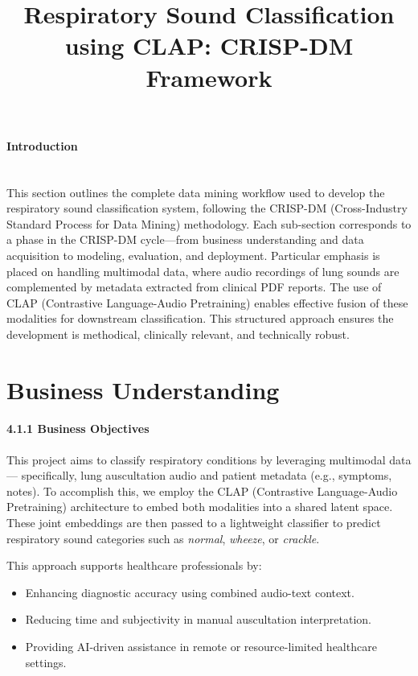 
\title{Respiratory Sound Classification using CLAP: CRISP-DM Framework}

\paragraph{Introduction\\\\}
This section outlines the complete data mining workflow used to develop the respiratory sound classification system, following the CRISP-DM (Cross-Industry Standard Process for Data Mining) methodology. Each sub-section corresponds to a phase in the CRISP-DM cycle—from business understanding and data acquisition to modeling, evaluation, and deployment. Particular emphasis is placed on handling multimodal data, where audio recordings of lung sounds are complemented by metadata extracted from clinical PDF reports. The use of CLAP (Contrastive Language-Audio Pretraining) enables effective fusion of these modalities for downstream classification. This structured approach ensures the development is methodical, clinically relevant, and technically robust.

\newpage
\section{Business Understanding} 
\paragraph{4.1.1 Business Objectives\\}
This project aims to classify respiratory conditions by leveraging multimodal data — specifically, lung auscultation audio and patient metadata (e.g., symptoms, notes). To accomplish this, we employ the CLAP \cite{hsu2023clap}  (Contrastive Language-Audio Pretraining) architecture to embed both modalities into a shared latent space. These joint embeddings are then passed to a lightweight classifier to predict respiratory sound categories such as \textit{normal}, \textit{wheeze}, or \textit{crackle}.

This approach supports healthcare professionals by:
\begin{itemize}
    \item Enhancing diagnostic accuracy using combined audio-text context.
    \item Reducing time and subjectivity in manual auscultation interpretation.
    \item Providing AI-driven assistance in remote or resource-limited healthcare settings.
\end{itemize}

